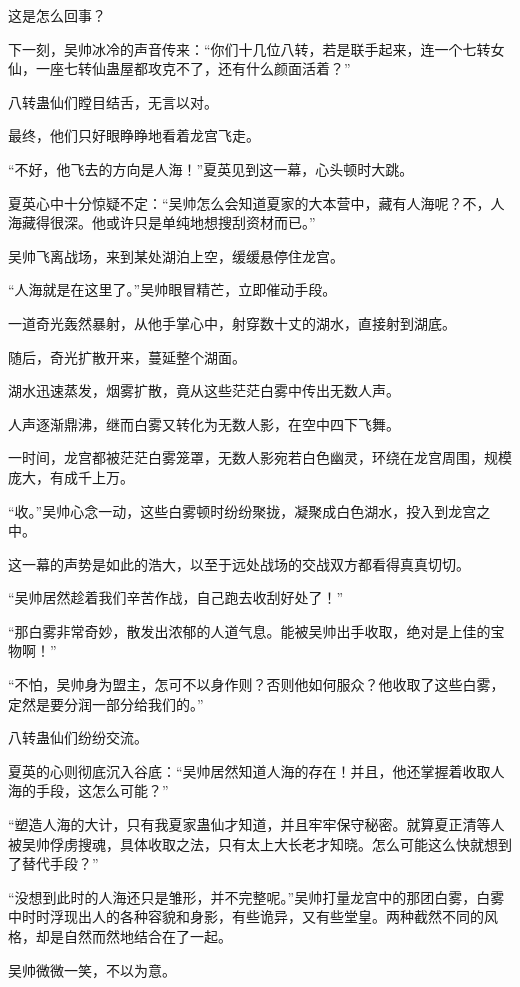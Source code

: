 \begin{this_body}
这是怎么回事？

下一刻，吴帅冰冷的声音传来：“你们十几位八转，若是联手起来，连一个七转女仙，一座七转仙蛊屋都攻克不了，还有什么颜面活着？”

八转蛊仙们瞠目结舌，无言以对。

最终，他们只好眼睁睁地看着龙宫飞走。

“不好，他飞去的方向是人海！”夏英见到这一幕，心头顿时大跳。

夏英心中十分惊疑不定：“吴帅怎么会知道夏家的大本营中，藏有人海呢？不，人海藏得很深。他或许只是单纯地想搜刮资材而已。”

吴帅飞离战场，来到某处湖泊上空，缓缓悬停住龙宫。

“人海就是在这里了。”吴帅眼冒精芒，立即催动手段。

一道奇光轰然暴射，从他手掌心中，射穿数十丈的湖水，直接射到湖底。

随后，奇光扩散开来，蔓延整个湖面。

湖水迅速蒸发，烟雾扩散，竟从这些茫茫白雾中传出无数人声。

人声逐渐鼎沸，继而白雾又转化为无数人影，在空中四下飞舞。

一时间，龙宫都被茫茫白雾笼罩，无数人影宛若白色幽灵，环绕在龙宫周围，规模庞大，有成千上万。

“收。”吴帅心念一动，这些白雾顿时纷纷聚拢，凝聚成白色湖水，投入到龙宫之中。

这一幕的声势是如此的浩大，以至于远处战场的交战双方都看得真真切切。

“吴帅居然趁着我们辛苦作战，自己跑去收刮好处了！”

“那白雾非常奇妙，散发出浓郁的人道气息。能被吴帅出手收取，绝对是上佳的宝物啊！”

“不怕，吴帅身为盟主，怎可不以身作则？否则他如何服众？他收取了这些白雾，定然是要分润一部分给我们的。”

八转蛊仙们纷纷交流。

夏英的心则彻底沉入谷底：“吴帅居然知道人海的存在！并且，他还掌握着收取人海的手段，这怎么可能？”

“塑造人海的大计，只有我夏家蛊仙才知道，并且牢牢保守秘密。就算夏正清等人被吴帅俘虏搜魂，具体收取之法，只有太上大长老才知晓。怎么可能这么快就想到了替代手段？”

“没想到此时的人海还只是雏形，并不完整呢。”吴帅打量龙宫中的那团白雾，白雾中时时浮现出人的各种容貌和身影，有些诡异，又有些堂皇。两种截然不同的风格，却是自然而然地结合在了一起。

吴帅微微一笑，不以为意。


\end{this_body}
